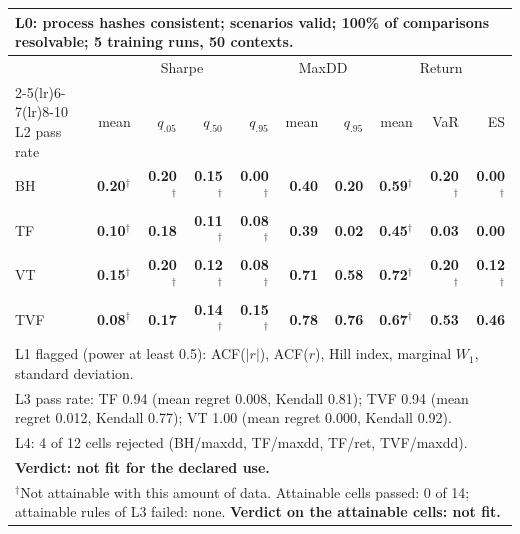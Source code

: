 \begin{tabular}{lrrrrrrrrr}
\toprule
\multicolumn{10}{p{13.5cm}}{L0: process hashes consistent; scenarios valid; 100\% of comparisons resolvable; 5 training runs, 50 contexts.} \\
\midrule
 & \multicolumn{4}{c}{Sharpe} & \multicolumn{2}{c}{MaxDD} & \multicolumn{3}{c}{Return} \\
\cmidrule(lr){2-5}\cmidrule(lr){6-7}\cmidrule(lr){8-10}
L2 pass rate & mean & $q_{.05}$ & $q_{.50}$ & $q_{.95}$ & mean & $q_{.95}$ & mean & VaR & ES \\
\midrule
BH & \textbf{0.20}$^{\dagger}$ & \textbf{0.20}$^{\dagger}$ & \textbf{0.15}$^{\dagger}$ & \textbf{0.00}$^{\dagger}$ & \textbf{0.40} & \textbf{0.20} & \textbf{0.59}$^{\dagger}$ & \textbf{0.20}$^{\dagger}$ & \textbf{0.00}$^{\dagger}$ \\
TF & \textbf{0.10}$^{\dagger}$ & \textbf{0.18} & \textbf{0.11}$^{\dagger}$ & \textbf{0.08}$^{\dagger}$ & \textbf{0.39} & \textbf{0.02} & \textbf{0.45}$^{\dagger}$ & \textbf{0.03} & \textbf{0.00} \\
VT & \textbf{0.15}$^{\dagger}$ & \textbf{0.20}$^{\dagger}$ & \textbf{0.12}$^{\dagger}$ & \textbf{0.08}$^{\dagger}$ & \textbf{0.71} & \textbf{0.58} & \textbf{0.72}$^{\dagger}$ & \textbf{0.20}$^{\dagger}$ & \textbf{0.12}$^{\dagger}$ \\
TVF & \textbf{0.08}$^{\dagger}$ & \textbf{0.17} & \textbf{0.14}$^{\dagger}$ & \textbf{0.15}$^{\dagger}$ & \textbf{0.78} & \textbf{0.76} & \textbf{0.67}$^{\dagger}$ & \textbf{0.53} & \textbf{0.46} \\
\midrule
\multicolumn{10}{p{13.5cm}}{L1 flagged (power at least 0.5): ACF($|r|$), ACF($r$), Hill index, marginal $W_1$, standard deviation.} \\
\multicolumn{10}{p{13.5cm}}{L3 pass rate: TF 0.94 (mean regret 0.008, Kendall 0.81); TVF 0.94 (mean regret 0.012, Kendall 0.77); VT 1.00 (mean regret 0.000, Kendall 0.92).} \\
\multicolumn{10}{p{13.5cm}}{L4: 4 of 12 cells rejected (BH/maxdd, TF/maxdd, TF/ret, TVF/maxdd).} \\
\multicolumn{10}{p{13.5cm}}{\textbf{Verdict: not fit for the declared use.}} \\
\multicolumn{10}{p{13.5cm}}{$^{\dagger}$Not attainable with this amount of data. Attainable cells passed: 0 of 14; attainable rules of L3 failed: none. \textbf{Verdict on the attainable cells: not fit.}} \\
\bottomrule
\end{tabular}

